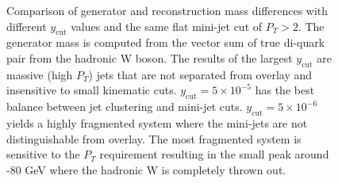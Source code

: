 \begin{figure}
    \centering
        \centering
        
        \caption{Comparison of generator and reconstruction mass differences with different $y_{\text{cut}}$ values and the same  flat mini-jet cut of $P_T > 2$. The generator mass is computed from the vector sum of true di-quark pair from the hadronic W boson. The results of the largest $y_{\text{cut}}$ are massive (high $P_T$) jets that are not separated from overlay and insensitive to small kinematic cuts. $y_{\text{cut}} = 5\times 10^{-5}$ has the best balance between jet clustering and mini-jet cuts. $y_{\text{cut}} = 5\times 10^{-6}$ yields a highly fragmented system where the mini-jets are not distinguishable from overlay. The most fragmented system is sensitive to the $P_T$ requirement resulting in the small peak around -80 GeV where the hadronic W is completely thrown out.  }
        \label{fig:supdiff}
       \end{figure}
       
